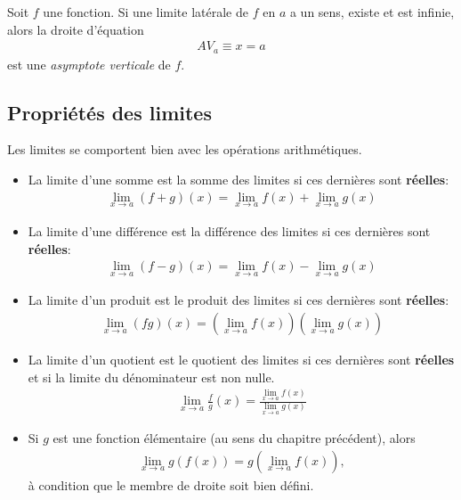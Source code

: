 \documentclass[main.tex]{subfiles}
\begin{document}
\begin{definition}

    Soit $f$ une fonction.
    Si une limite latérale de $f$ en $a$ a un sens, existe et est infinie,
    alors la droite d'équation
    \begin{align}
        AV_a \equiv x = a
    \end{align}
    est une \emph{asymptote verticale} de $f$.
\end{definition}

\subsection{Propriétés des limites}

Les limites se comportent bien avec les opérations arithmétiques.

\begin{howto}

    \begin{itemize}
        \item La limite d'une somme est la somme des limites si ces dernières sont \textbf{réelles}:
            \begin{align}
                \lim_{x \to a} (f + g)(x) = \lim_{x \to a} f(x) + \lim_{x \to a} g(x)
            \end{align}
        \item La limite d'une différence est la différence des limites si ces dernières sont \textbf{réelles}:
            \begin{align}
                \lim_{x \to a} (f - g)(x) = \lim_{x \to a} f(x) - \lim_{x \to a} g(x)
            \end{align}
        \item La limite d'un produit est le produit des limites si ces dernières sont \textbf{réelles}:
            \begin{align}
                \lim_{x \to a} (f g)(x) = \left(\lim_{x \to a} f(x)\right) \left(\lim_{x \to a} g(x)\right)
            \end{align}
        \item La limite d'un quotient est le quotient des limites si ces dernières sont \textbf{réelles}
            et si la limite du dénominateur est non nulle.
            \begin{align}
                \lim_{x \to a} \frac f g(x) = \frac {\lim_{x \to a} f(x)} {\lim_{x \to a} g(x)}
            \end{align}
        \item Si $g$ est une fonction élémentaire (au sens du chapitre précédent),
            alors
            \begin{align*}
                \lim_{x \to a} g(f(x)) = g(\lim_{x \to a} f(x)),
            \end{align*}
            à condition que le membre de droite soit bien défini.
    \end{itemize}
\end{howto}
\end{document}
